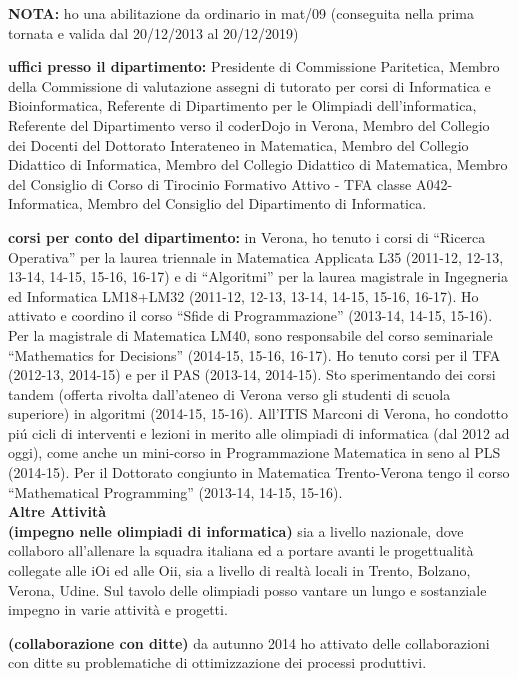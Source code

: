 \documentclass[10pt]{article}
\newcommand{\subvoice}[1] { {\large \bf #1} \smallskip\\ }
\begin{document}
{\bf NOTA:}  ho una abilitazione da ordinario in mat/09
(conseguita nella prima tornata e valida dal 20/12/2013 al 20/12/2019)

{\bf uffici presso il dipartimento:} Presidente di Commissione Paritetica, Membro della Commissione di valutazione assegni di tutorato per corsi di Informatica e Bioinformatica, Referente di Dipartimento per le Olimpiadi dell'informatica, Referente del Dipartimento verso il coderDojo in Verona, Membro del Collegio dei Docenti del Dottorato Interateneo in Matematica, Membro del Collegio Didattico di Informatica, Membro del Collegio Didattico di Matematica, Membro del Consiglio di Corso di Tirocinio Formativo Attivo - TFA classe A042- Informatica, Membro del Consiglio del Dipartimento di Informatica.

{\bf corsi per conto del dipartimento:} in Verona,
ho tenuto i corsi
di ``Ricerca Operativa''
per la laurea triennale in Matematica Applicata L35 (2011-12, 12-13, 13-14, 14-15, 15-16, 16-17)
e di ``Algoritmi''
per la laurea magistrale in Ingegneria ed Informatica LM18+LM32 (2011-12, 12-13, 13-14, 14-15, 15-16, 16-17).
Ho attivato e coordino il corso ``Sfide di Programmazione'' (2013-14, 14-15, 15-16).
Per la magistrale di Matematica LM40, sono responsabile del corso seminariale ``Mathematics for Decisions'' (2014-15, 15-16, 16-17).
Ho tenuto corsi per il TFA (2012-13, 2014-15) e per il PAS (2013-14, 2014-15).
Sto sperimentando dei corsi tandem (offerta rivolta dall'ateneo di Verona verso gli studenti di scuola superiore) in algoritmi (2014-15, 15-16).
All'ITIS Marconi di Verona, ho condotto pi\'u cicli di interventi e lezioni in merito alle olimpiadi di informatica (dal 2012 ad oggi),
come anche un mini-corso in Programmazione Matematica in seno al PLS (2014-15). 
Per il Dottorato congiunto in Matematica Trento-Verona tengo il corso
``Mathematical Programming'' (2013-14, 14-15, 15-16).\\



\subvoice{Altre Attivit\`a}
\indent
{\bf (impegno nelle olimpiadi di informatica)}
sia a livello nazionale, dove collaboro all'allenare la squadra italiana
ed a portare avanti le progettualit\`a collegate alle iOi ed alle Oii,
sia a livello di realt\`a locali in Trento, Bolzano, Verona, Udine.
Sul tavolo delle olimpiadi posso vantare un lungo e sostanziale impegno in varie attivit\`a e progetti. 

{\bf (collaborazione con ditte)}
da autunno 2014 ho attivato delle collaborazioni con ditte
su problematiche di ottimizzazione dei processi produttivi.
\end{document}
